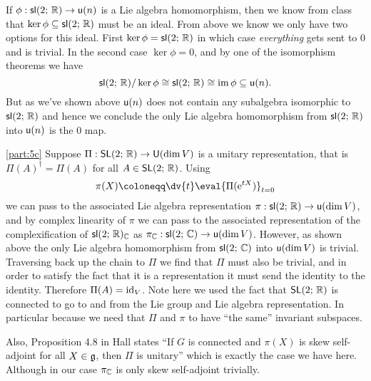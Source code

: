 \documentclass[
	pages,
	boxes,
	color=WildStrawberry
]{homework}
\theoremstyle{plain}
\begin{document}
\begin{solution}
	If $\phi: \mathsf{sl}(2;\, \mathbb{R}) \to \mathsf{u}(n)$ is a Lie algebra homomorphism, then we know from class that $\ker\phi\subseteq\mathsf{sl}(2;\, \mathbb{R})$ must be an ideal. From above we know we only have two options for this ideal. First $\ker\phi = \mathsf{sl}(2;\, \mathbb{R})$ in which case \emph{everything} gets sent to $0$ and is trivial. In the second case $\ker\phi = \qty{0}$, and by one of the isomorphism theorems we have
	\begin{equation*}
		\mathsf{sl}(2;\, \mathbb{R})/\ker{\phi}\cong\mathsf{sl}(2;\, \mathbb{R})\cong\operatorname{im}{\phi}\subseteq\mathsf{u}(n).
	\end{equation*}
	But as we've shown above $\mathsf{u}(n)$ does not contain any subalgebra isomorphic to $\mathsf{sl}(2;\, \mathbb{R})$ and hence we conclude the only Lie algebra homomorphism from $\mathsf{sl}(2;\, \mathbb{R})$ into $\mathsf{u}(n)$ is the $0$ map.

	\ref{part:5c}
	Suppose $\Pi:\mathsf{SL}(2;\, \mathbb{R}) \to \mathsf{U}(\dim V)$ is a unitary representation, that is $\Pi(A)^\dagger = \Pi(A)$ for all $A \in \mathsf{SL}(2;\, \mathbb{R})$. Using
	\begin{equation*}
		\pi(X) \defeq \dv{t}\eval{\Pi(\e^{tX})}_{t=0}
	\end{equation*}
	we can pass to the associated Lie algebra representation $\pi: \mathsf{sl}(2;\, \mathbb{R})\to\mathsf{u}(\dim V)$, and by complex linearity of $\pi$ we can pass to the associated representation of the complexification of $\mathsf{sl}(2;\, \mathbb{R})_{\mathbb{C}}$ as $\pi_{\mathbb{C}}: \mathsf{sl}(2;\, \mathbb{C}) \to \mathsf{u}(\dim V)$. However, as shown above the only Lie algebra homomorphism from $\mathsf{sl}(2;\, \mathbb{C})$ into $\mathsf{u}(\dim V)$ is trivial. Traversing back up the chain to $\Pi$ we find that $\Pi$ must also be trivial, and in order to satisfy the fact that it is a representation it must send the identity to the identity. Therefore $\Pi(A) = \operatorname{id}_V$. Note here we used the fact that $\mathsf{SL}(2;\, \mathbb{R})$ is connected to go to and from the Lie group and Lie algebra representation. In particular because we need that $\Pi$ and $\pi$ to have ``the same'' invariant subspaces.

	Also, Proposition 4.8 in Hall states ``If $G$ is connected and $\pi(X)$ is skew self-adjoint for all $X\in\mathfrak{g}$, then $\Pi$ is unitary'' which is exactly the case we have here. Although in our case $\pi_{\mathbb{C}}$ is only skew self-adjoint trivially.
\end{solution}
\end{document}

